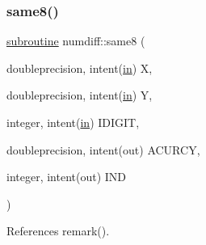 \mbox{\label{numdiff_8f90_ad61224828d0e9d4b998278d50ab4842f}} 
\subsubsection{\texorpdfstring{same8()}{same8()}}
{\footnotesize\ttfamily \hyperlink{M__stopwatch_83_8txt_acfbcff50169d691ff02d4a123ed70482}{subroutine} numdiff\+::same8 (\begin{DoxyParamCaption}\item[{doubleprecision, intent(\hyperlink{M__journal_83_8txt_afce72651d1eed785a2132bee863b2f38}{in})}]{X,  }\item[{doubleprecision, intent(\hyperlink{M__journal_83_8txt_afce72651d1eed785a2132bee863b2f38}{in})}]{Y,  }\item[{integer, intent(\hyperlink{M__journal_83_8txt_afce72651d1eed785a2132bee863b2f38}{in})}]{I\+D\+I\+G\+IT,  }\item[{doubleprecision, intent(out)}]{A\+C\+U\+R\+CY,  }\item[{integer, intent(out)}]{I\+ND }\end{DoxyParamCaption})}



References remark().

